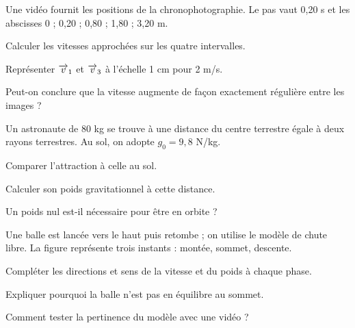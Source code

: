 \label{defi-ex-11-1}
Une vidéo fournit les positions de la chronophotographie. Le pas vaut 0,20 s et les abscisses 0 ; 0,20 ; 0,80 ; 1,80 ; 3,20 m.
\begin{questions}
\item Calculer les vitesses approchées sur les quatre intervalles.
\item Représenter $\overrightarrow{v}_1$ et $\overrightarrow{v}_3$ à l’échelle 1 cm pour 2 m/s.
\item Peut-on conclure que la vitesse augmente de façon exactement régulière entre les images ?
\end{questions}
\smallskip{}\hfill{}

\label{defi-ex-12-1}
Un astronaute de 80 kg se trouve à une distance du centre terrestre égale à deux rayons terrestres. Au sol, on adopte $g_0=9,8$ N/kg.
\begin{questions}
\item Comparer l’attraction à celle au sol.
\item Calculer son poids gravitationnel à cette distance.
\item Un poids nul est-il nécessaire pour être en orbite ?
\end{questions}
\smallskip{}\hfill{}

\label{defi-ex-13-1}
Une balle est lancée vers le haut puis retombe ; on utilise le modèle de chute libre. La figure représente trois instants : montée, sommet, descente.
\begin{questions}
\item Compléter les directions et sens de la vitesse et du poids à chaque phase.
\item Expliquer pourquoi la balle n’est pas en équilibre au sommet.
\item Comment tester la pertinence du modèle avec une vidéo ?
\end{questions}
\smallskip{}\hfill{}

